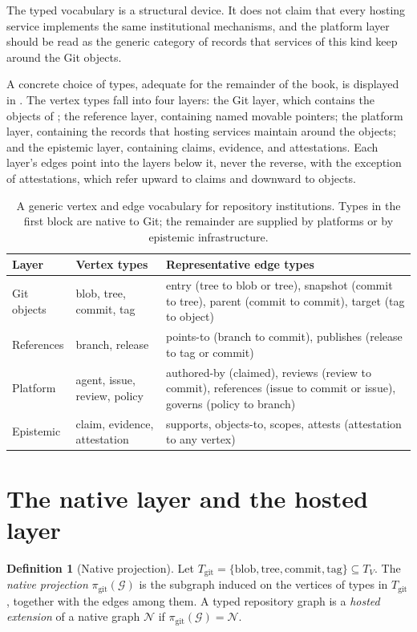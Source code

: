 \documentclass[11pt,twoside,openright]{book}
\theoremstyle{plain}
\theoremstyle{definition}
\newtheorem{definition}[theorem]{Definition}
\theoremstyle{remark}
\begin{document}
The typed vocabulary is a structural device. It does not claim that every hosting service implements the same institutional mechanisms, and the platform layer should be read as the generic category of records that services of this kind keep around the Git objects.

A concrete choice of types, adequate for the remainder of the book, is displayed in . The vertex types fall into four layers: the Git layer, which contains the objects of ; the reference layer, containing named movable pointers; the platform layer, containing the records that hosting services maintain around the objects; and the epistemic layer, containing claims, evidence, and attestations. Each layer's edges point into the layers below it, never the reverse, with the exception of attestations, which refer upward to claims and downward to objects.

\begin{table}[t]
\centering
\caption{A generic vertex and edge vocabulary for repository institutions. Types in the first block are native to Git; the remainder are supplied by platforms or by epistemic infrastructure.}
\label{tab:types}
\small
\begin{tabular}{p{}p{}p{}}
\toprule
Layer & Vertex types & Representative edge types \\
\midrule
Git objects & blob, tree, commit, tag & entry (tree to blob or tree), snapshot (commit to tree), parent (commit to commit), target (tag to object) \\
References & branch, release & points-to (branch to commit), publishes (release to tag or commit) \\
Platform & agent, issue, review, policy & authored-by (claimed), reviews (review to commit), references (issue to commit or issue), governs (policy to branch) \\
Epistemic & claim, evidence, attestation & supports, objects-to, scopes, attests (attestation to any vertex) \\
\bottomrule
\end{tabular}
\end{table}

\section{The native layer and the hosted layer}

\begin{definition}[Native projection]\label{def:projection}
Let $T_{\mathrm{git}}=\{\mathrm{blob},\mathrm{tree},\mathrm{commit},\mathrm{tag}\}\subseteq T_V$. The \emph{native projection} $\pi_{\mathrm{git}}(\mathcal{G})$ is the subgraph induced on the vertices of types in $T_{\mathrm{git}}$, together with the edges among them. A typed repository graph is a \emph{hosted extension} of a native graph $\mathcal{N}$ if $\pi_{\mathrm{git}}(\mathcal{G})=\mathcal{N}$.
\end{definition}
\end{document}

